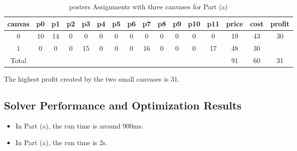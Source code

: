 \documentclass{article}
\begin{document}
\begin{table}[H]
\centering
\caption{posters Assignments with three canvases for Part (a)}
\small
\begin{tabular}{c|cccccccccccc|c|c|c}
\toprule
canvas & p0 & p1 & p2 & p3 & p4  & p5 & p6 & p7 & p8 & p9 & p10 & p11 & price & cost & profit\\
\midrule
0 & 10 & 14 & 0 & 0 & 0 & 0 & 0 & 0 & 0 & 0 & 0 & 0 & 19 & 43 & 30\\
1 & 0 & 0 & 0 & 15 & 0 & 0 & 0 & 16 & 0 & 0 & 0 & 17 & 48 & 30 &\\
\midrule
Total & & & & & & & & & & & & & 91 & 60 & 31\\
\bottomrule
\end{tabular}
\end{table}
The highest profit created by the two small canvases is 31.

\subsection{Solver Performance and Optimization Results}

\begin{itemize}
    \item   
    In Part (a), the run time is around 900ms.
    \item 
    In Part (a), the run time is 2s.
\end{itemize}
\end{document}
